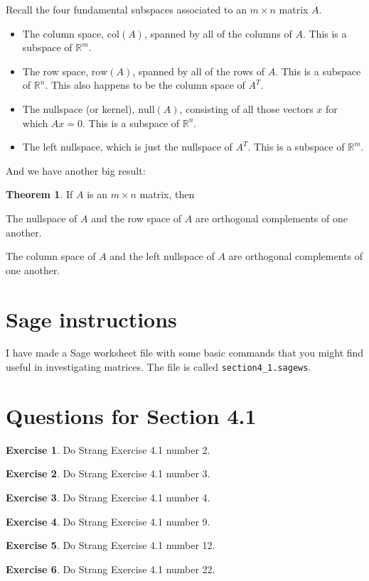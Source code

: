 \documentclass[11pt]{amsart}
\theoremstyle{definition}
\newtheorem{exercise}{Exercise}
\newtheorem*{theorem}{Theorem}
\begin{document}
Recall the four fundamental subspaces associated to an $m\times n$ matrix $A$.
\begin{itemize}
\item The column space, $\mathrm{col}(A)$, spanned by all of the columns of $A$. This is a subspace of $\mathbb{R}^m$.
\item The row space, $\mathrm{row}(A)$, spanned by all of the rows of $A$. This is a subspace of $\mathbb{R}^n$. This also happens to be the column space of $A^T$.
\item The nullspace (or kernel), $\mathrm{null}(A)$, consisting of all those vectors $x$ for which $Ax=0$. This is a subspace of $\mathbb{R}^n$.
\item The left nullspace, which is just the nullspace of $A^T$. This is a subspace of $\mathbb{R}^m$.
\end{itemize}

And we have another big result:

\begin{theorem}
If $A$ is an $m\times n$ matrix, then
\begin{compactitem}
\item The nullspace of $A$ and the row space of $A$ are orthogonal complements of one another.
\item The column space of $A$ and the left nullspace of $A$ are orthogonal complements of one another.
\end{compactitem}
\end{theorem}


\section{Sage instructions}

I have made a Sage worksheet file with some basic commands that you might find useful in investigating matrices. The file is called \texttt{section4\_1.sagews}.


\section{Questions for Section 4.1}
\setcounter{exercise}{116}

\begin{exercise} Do Strang Exercise 4.1 number 2. \end{exercise}
\begin{exercise} Do Strang Exercise 4.1 number 3. \end{exercise}
\begin{exercise} Do Strang Exercise 4.1 number 4. \end{exercise}
\begin{exercise} Do Strang Exercise 4.1 number 9. \end{exercise}
\begin{exercise} Do Strang Exercise 4.1 number 12. \end{exercise}
\begin{exercise} Do Strang Exercise 4.1 number 22. \end{exercise}
\end{document}
